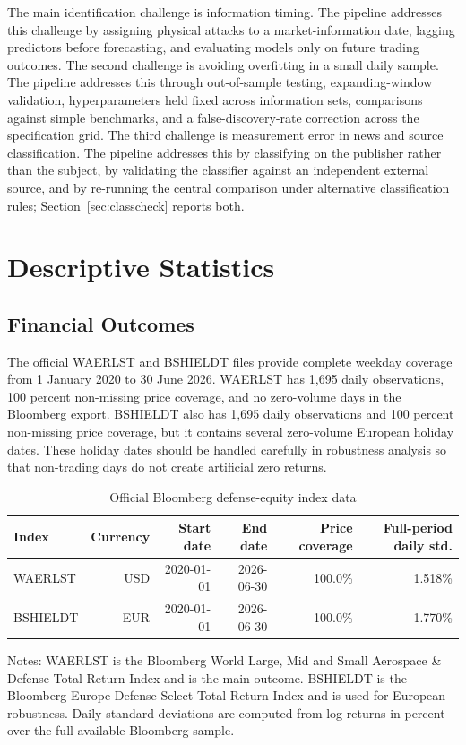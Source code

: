 \documentclass[12pt,a4paper]{article}
\begin{document}
The main identification challenge is information timing. The pipeline addresses this challenge by assigning physical attacks to a market-information date, lagging predictors before forecasting, and evaluating models only on future trading outcomes. The second challenge is avoiding overfitting in a small daily sample. The pipeline addresses this through out-of-sample testing, expanding-window validation, hyperparameters held fixed across information sets, comparisons against simple benchmarks, and a false-discovery-rate correction across the specification grid. The third challenge is measurement error in news and source classification. The pipeline addresses this by classifying on the publisher rather than the subject, by validating the classifier against an independent external source, and by re-running the central comparison under alternative classification rules; Section~\ref{sec:classcheck} reports both.

\section{Descriptive Statistics}

\subsection{Financial Outcomes}

The official WAERLST and BSHIELDT files provide complete weekday coverage from 1 January 2020 to 30 June 2026. WAERLST has 1,695 daily observations, 100 percent non-missing price coverage, and no zero-volume days in the Bloomberg export. BSHIELDT also has 1,695 daily observations and 100 percent non-missing price coverage, but it contains several zero-volume European holiday dates. These holiday dates should be handled carefully in robustness analysis so that non-trading days do not create artificial zero returns.

\begin{table}[H]
\centering
\caption{Official Bloomberg defense-equity index data}
\label{tab:financial_data}
\begin{threeparttable}
\begin{tabular}{lrrrrr}
\toprule
Index & Currency & Start date & End date & Price coverage & Full-period daily std. \\
\midrule
WAERLST & USD & 2020-01-01 & 2026-06-30 & 100.0\% & 1.518\% \\
BSHIELDT & EUR & 2020-01-01 & 2026-06-30 & 100.0\% & 1.770\% \\
\bottomrule
\end{tabular}
\begin{tablenotes}
\small
\item Notes: WAERLST is the Bloomberg World Large, Mid and Small Aerospace \& Defense Total Return Index and is the main outcome. BSHIELDT is the Bloomberg Europe Defense Select Total Return Index and is used for European robustness. Daily standard deviations are computed from log returns in percent over the full available Bloomberg sample.
\end{tablenotes}
\end{threeparttable}
\end{table}
\end{document}
